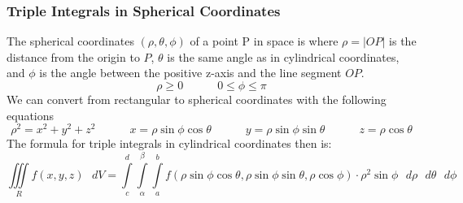 \documentclass[11pt]{article}
\begin{document}
\subsubsection{Triple Integrals in Spherical Coordinates}
The spherical coordinates  $(\rho, \theta, \phi)$ of a point P in space is where $ \rho =|OP|$ is the distance from the origin to $P$, $\theta$ is the same angle as in cylindrical coordinates, and $\phi$ is the angle between the positive z-axis and the line segment $OP$.
$$ \rho \geq 0 \quad \quad \quad 0 \leq \phi \leq \pi$$ 
We can convert from rectangular to spherical coordinates with the following equations
$$\rho^2 = x^2 + y^2 + z^2 \quad \quad \quad x = \rho\sin\phi \cos \theta \quad \quad \quad y = \rho \sin \phi\sin\theta \quad \quad \quad z=\rho \cos \theta$$
The formula for triple integrals in cylindrical coordinates then is:
$$\iiint\limits_{R} f(x,y,z)\text{ }dV = \int\limits_{c}^{d} \int\limits_{\alpha}^{\beta} \int\limits_{a}^{b} f(\rho\sin\phi \cos \theta,\rho \sin\phi \sin \theta,\rho\cos\phi)\cdot \rho^2 \sin \phi \text{ }d\rho \text{ }d\theta \text{ }d\phi $$
\end{document}
